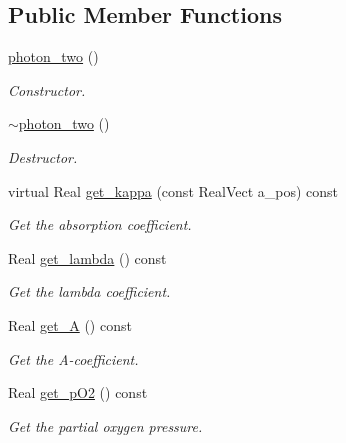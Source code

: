 \subsection*{Public Member Functions}
\begin{DoxyCompactItemize}
\item 
\hyperlink{classmorrow__lowke_1_1photon__two_a469d549e408214c125e946ae23047fe0}{photon\+\_\+two} ()
\begin{DoxyCompactList}\small\item\em Constructor. \end{DoxyCompactList}\item 
\hyperlink{classmorrow__lowke_1_1photon__two_a8141f1ba75e75d4d486283fc02f838f7}{$\sim$photon\+\_\+two} ()
\begin{DoxyCompactList}\small\item\em Destructor. \end{DoxyCompactList}\item 
virtual Real \hyperlink{classmorrow__lowke_1_1photon__two_aadc7dd396c30a16db2ecb6616e18ca02}{get\+\_\+kappa} (const Real\+Vect a\+\_\+pos) const 
\begin{DoxyCompactList}\small\item\em Get the absorption coefficient. \end{DoxyCompactList}\item 
Real \hyperlink{classmorrow__lowke_1_1photon__two_ad7e7ed59562917c73a098c092b656a80}{get\+\_\+lambda} () const 
\begin{DoxyCompactList}\small\item\em Get the lambda coefficient. \end{DoxyCompactList}\item 
Real \hyperlink{classmorrow__lowke_1_1photon__two_ac085832e326180e23a89688ef3104653}{get\+\_\+A} () const 
\begin{DoxyCompactList}\small\item\em Get the A-\/coefficient. \end{DoxyCompactList}\item 
Real \hyperlink{classmorrow__lowke_1_1photon__two_a2a805f305efc380ecca611905f2b8aff}{get\+\_\+p\+O2} () const 
\begin{DoxyCompactList}\small\item\em Get the partial oxygen pressure. \end{DoxyCompactList}\end{DoxyCompactItemize}
